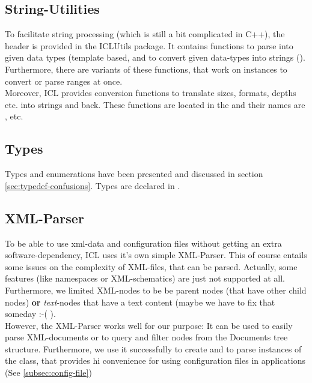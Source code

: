 \subsection{String-Utilities}
To facilitate string processing (which is still a bit complicated in C++), the header  is provided in the ICLUtils package. It contains functions to parse  into given data types (template based,  and to convert given data-types into strings (). Furthermore, there are variants of these functions, that work on  instances to convert or parse ranges at once.\\
Moreover, ICL provides conversion functions to translate sizes, formats, depths etc. into strings and back. These functions are located in the  and their names are ,  etc.

\subsection{Types}
Types and enumerations have been presented and discussed in section \ref{sec:typedef-confusions}. Types are declared in .

\subsection{XML-Parser}
To be able to use xml-data and configuration files without getting an extra software-dependency, ICL uses it's own simple XML-Parser. This of course entails some issues on the complexity of XML-files, that can be parsed. Actually, some features (like namespaces or XML-schematics) are just not supported at all. Furthermore, we limited XML-nodes to be be parent nodes (that have other child nodes) \textbf{or} \emph{text}-nodes that have a text content (maybe we have to fix that someday :-( ).\\
However, the XML-Parser works well for our purpose: It can be used to easily parse XML-documents or to query and filter nodes from the Documents tree structure. Furthermore, we use it successfully to create and to parse instances of the  class, that provides hi convenience for using configuration files in applications (See \ref{subsec:config-file})

